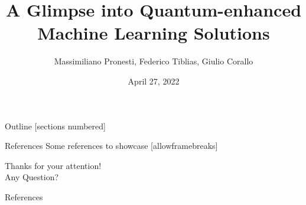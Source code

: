 \documentclass[10pt]{beamer}
\title{A Glimpse into Quantum-enhanced Machine Learning Solutions}
\date{April 27, 2022}
\author{
	Massimiliano Pronesti, 
	Federico Tiblias, 
	Giulio Corallo
}
\institute{Amadeus Knowledge Sharing Session}
\begin{document}
	
	\maketitle
	
	
	
	\begin{frame}{Outline}
		[sections numbered]
		\tableofcontents
	\end{frame}
	
	    
    
	
	
	
	
	\begin{frame}{References}
		Some references to showcase [allowframebreaks] \cite{knuth92,ConcreteMath,Simpson,Er01,greenwade93}
	\end{frame}
	
    
	
	
	
	\begin{frame}[standout]
		Thanks for your attention!\\
		 Any Question? ~\alert{\faSmileO}~
	\end{frame}
	
	
	\appendix
	
	\begin{frame}[allowframebreaks]{References}
		
		
	\end{frame}
	
\end{document}

